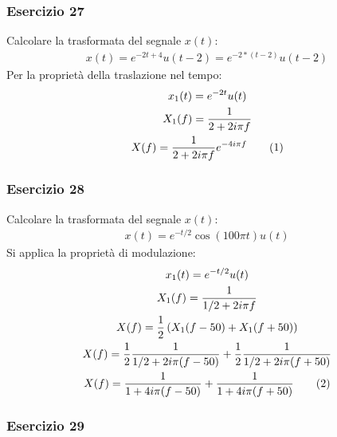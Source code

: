 \documentclass{article}
\newcommand{\tageq}{\tag{\stepcounter{equation}\theequation}}
\begin{document}
\subsubsection*{Esercizio 27}

Calcolare la trasformata del segnale $x(t)$: 
\begin{gather*}
    x(t)=e^{-2t+4}u(t-2)=e^{-2*(t-2)}u(t-2)
\end{gather*}
Per la proprietà della traslazione nel tempo:
\begin{gather*}
    x_1(t)=e^{-2t}u(t)\\
    X_1(f)=\displaystyle\frac{1}{2+2i\pi f}\\
    X(f)=\displaystyle\frac{1}{2+2i\pi f}e^{-4i\pi f}\tageq
\end{gather*}

\subsubsection*{Esercizio 28}

Calcolare la trasformata del segnale $x(t)$:
\begin{gather*}
    x(t)=e^{-t/2}\cos(100\pi t)u(t)
\end{gather*}
Si applica la proprietà di modulazione:
\begin{gather*}
    x_1(t)=e^{-t/2}u(t)\\
    X_1(f)=\displaystyle\frac{1}{1/2+2i\pi f}\\
    X(f)=\displaystyle\frac{1}{2}\left(X_1(f-50)+X_1(f+50)\right)\\
    X(f)=\displaystyle\frac{1}{2}\frac{1}{1/2+2i\pi (f-50)}+\frac{1}{2}\frac{1}{1/2+2i\pi (f+50)}\\
    X(f)=\displaystyle\frac{1}{1+4i\pi (f-50)}+\frac{1}{1+4i\pi (f+50)}\tageq
\end{gather*}

\subsubsection*{Esercizio 29}
\end{document}
